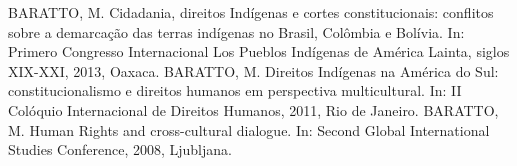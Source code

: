 %


\begin{cvcitems}
  \cvcitem
    {BARATTO, M.}
    {Cidadania, direitos Indígenas e cortes constitucionais: conflitos sobre a demarcação das terras indígenas no Brasil, Colômbia e Bolívia. In: Primero Congresso Internacional Los Pueblos Indígenas de América Lainta, siglos XIX-XXI, 2013, Oaxaca.}
  \cvcitem
    {BARATTO, M.}
    {Direitos Indígenas na América do Sul: constitucionalismo e direitos humanos em perspectiva multicultural. In: II Colóquio Internacional de Direitos Humanos, 2011, Rio de Janeiro.}
  \cvcitem
    {BARATTO, M.}
    {Human Rights and cross-cultural dialogue. In: Second Global International Studies Conference, 2008, Ljubljana.}
\end{cvcitems}

%

